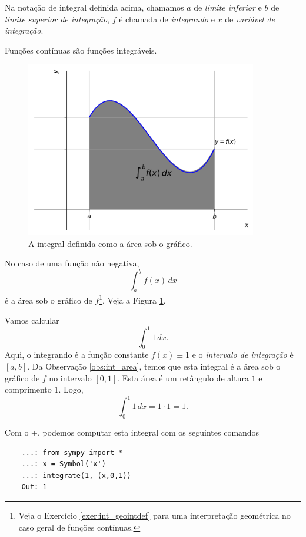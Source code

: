 \begin{obs}
  Na notação de integral definida acima, chamamos $a$ de \emph{limite inferior} e $b$ de \emph{limite superior de integração}, $f$ é chamada de \emph{integrando} e $x$ de \emph{variável de integração}.
\end{obs}

\begin{obs}
  Funções contínuas são funções integráveis.
\end{obs}

\begin{figure}[H]
  \centering
  \includegraphics[width=0.9\textwidth]{./cap_int/dados/fig_geointdef/fig_geointdef}
  \caption{A integral definida como a área sob o gráfico.}
  \label{fig:geointdef}
\end{figure}

\begin{obs}\label{obs:int_area}
  No caso de uma função não negativa,
  \begin{equation}
    \int_a^b f(x)\,dx
  \end{equation}
  é a área sob o gráfico de $f$\footnote{Veja o Exercício \ref{exer:int_geointdef} para uma interpretação geométrica no caso geral de funções contínuas.}. Veja a Figura \ref{fig:geointdef}.  
\end{obs}

\begin{ex}
  Vamos calcular
  \begin{equation}
    \int_0^1 1\,dx.
  \end{equation}
  Aqui, o integrando é a função constante $f(x) \equiv 1$ e o \emph{intervalo de integração} é $[a, b]$. Da Observação \ref{obs:int_area}, temos que esta integral é a área sob o gráfico de $f$ no intervalo $[0, 1]$. Esta área é um retângulo de altura $1$ e comprimento $1$. Logo,
  \begin{equation}
    \int_0^1 1\,dx = 1\cdot 1 = 1.
  \end{equation}

  \ifispython
  Com o {\python}+{\sympy}, podemos computar esta integral com os seguintes comandos
  \begin{lstlisting}
    ...: from sympy import *
    ...: x = Symbol('x')
    ...: integrate(1, (x,0,1))
    Out: 1
  \end{lstlisting}
  \fi
\end{ex}

